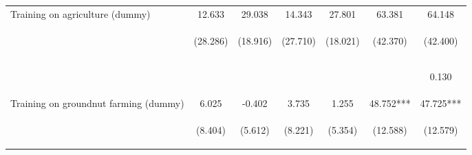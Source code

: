 \begin{center}
\begin{tabular}{lcccccc}
Training on agriculture (dummy) & 12.633 & 29.038 & 14.343 & 27.801 & 63.381 & 64.148 \\
 & \begin{footnotesize}(28.286)\end{footnotesize} & \begin{footnotesize}(18.916)\end{footnotesize} & \begin{footnotesize}(27.710)\end{footnotesize} & \begin{footnotesize}(18.021)\end{footnotesize} & \begin{footnotesize}(42.370)\end{footnotesize} & \begin{footnotesize}(42.400)\end{footnotesize} \\
\vspace{4pt} & \begin{footnotesize}[0.655]\end{footnotesize} & \begin{footnotesize}[0.125]\end{footnotesize} & \begin{footnotesize}[0.605]\end{footnotesize} & \begin{footnotesize}[0.123]\end{footnotesize} & \begin{footnotesize}[0.135]\end{footnotesize} & \begin{footnotesize}0.130\end{footnotesize} \\
Training on groundnut farming (dummy) & 6.025 & -0.402 & 3.735 & 1.255 & 48.752*** & 47.725*** \\
 & \begin{footnotesize}(8.404)\end{footnotesize} & \begin{footnotesize}(5.612)\end{footnotesize} & \begin{footnotesize}(8.221)\end{footnotesize} & \begin{footnotesize}(5.354)\end{footnotesize} & \begin{footnotesize}(12.588)\end{footnotesize} & \begin{footnotesize}(12.579)\end{footnotesize} \\

\end{tabular}
\end{center}
